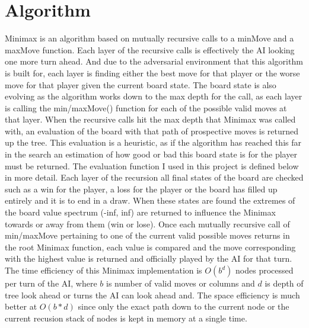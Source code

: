 \documentclass[conference]{IEEEtran}
\begin{document}
\section{Algorithm}
Minimax is an algorithm based on mutually recursive calls to a minMove and a maxMove function. Each layer of the recursive calls is effectively the AI looking one more turn ahead. And due to the adversarial environment that this algorithm is built for, each layer is finding either the best move for that player or the worse move for that player given the current board state. The board state is also evolving as the algorithm works down to the max depth for the call, as each layer is calling the min/maxMove() function for each of the possible valid moves at that layer. When the recursive calls hit the max depth that Minimax was called with, an evaluation of the board with that path of prospective moves is returned up the tree. This evaluation is a heuristic, as if the algorithm has reached this far in the search an estimation of how good or bad this board state is for the player must be returned. The evaluation function I used in this project is defined below in more detail. Each layer of the recursion all final states of the board are checked such as a win for the player, a loss for the player or the board has filled up entirely and it is to end in a draw. When these states are found the extremes of the board value spectrum (-inf, inf) are returned to influence the Minimax towards or away from them (win or lose). Once each mutually recursive call of min/maxMove pertaining to one of the current valid possible moves returns in the root Minimax function, each value is compared and the move corresponding with the highest value is returned and officially played by the AI for that turn. The time efficiency of this Minimax implementation is $O(b^d)$ nodes processed per turn of the AI, where $b$ is number of valid moves or columns and $d$ is depth of tree look ahead or turns the AI can look ahead and. The space efficiency is much better at $O(b*d)$ since only the exact path down to the current node or the current recusion stack of nodes is kept in memory at a single time.
\end{document}
